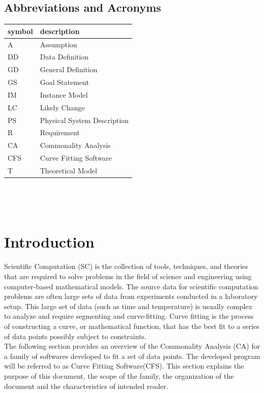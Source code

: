 \documentclass[12pt]{article}
\newcommand{\famname}{CFS} %
\begin{document}
\subsection{Abbreviations and Acronyms}

\renewcommand{\arraystretch}{1.2}
\begin{tabular}{l l} 
  \toprule		
  \textbf{symbol} & \textbf{description}\\
  \midrule 
  A & Assumption\\
  DD & Data Definition\\
  GD & General Definition\\
  GS & Goal Statement\\
  IM & Instance Model\\
  LC & Likely Change\\
  PS & Physical System Description\\
  R & Requirement\\
  CA & Commonality Analysis\\
  \famname & Curve Fitting Software\\
  T & Theoretical Model\\
  \bottomrule
\end{tabular}\\


\newpage

\tableofcontents

~\newpage


\section{Introduction}

Scientific Computation (SC) is the collection of tools, techniques, and theories that are required to solve problems in the field of science and engineering using computer-based mathematical models. The source data for scientific computation problems are often large sets of data from experiments conducted in a laboratory setup. This large set of data (such as time and temperature) is usually complex to analyze and require segmenting and curve-fitting. Curve fitting is the process of constructing a curve, or mathematical function, that has the best fit to a series of data points possibly subject to constraints.\\

The following section provides an overview of the Commonality Analysis (CA) for a family of softwares developed to fit a set of data points. The developed program will be referred to as Curve Fitting Software(\famname{}). This section explains the purpose of this document, the scope of the family, the organization of the document and the characteristics of intended reader.
 
\end{document}
